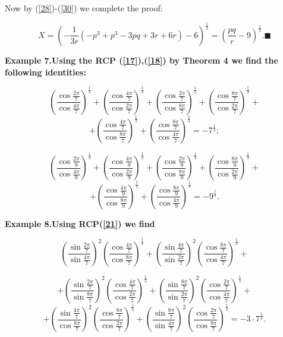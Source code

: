\documentclass[12pt,oneside,english]{amsart}
\begin{document}
Now by (\ref{28})-(\ref{30}) we complete the proof:

$$
X=\left(-\frac{1}{3r}(-p^3+p^3-3pq+3r+6r)-6\right)^{\frac 1
3}=\left(\frac{pq}{r}-9\right)^{\frac 1 3}. \blacksquare
$$

\bfseries Example 7.\mdseries  Using the RCP (\ref{17}),(\ref{18})
by Theorem 4 we find the following identities:

$$
\left(\frac{\cos\frac{2\pi}{7}}{\cos\frac{4\pi}{7}}\right)^{\frac 1
3}+\left(\frac{\cos\frac{4\pi}{7}}{\cos\frac{2\pi}{7}}\right)^{\frac
1
3}+\left(\frac{\cos\frac{2\pi}{7}}{\cos\frac{8\pi}{7}}\right)^{\frac
1
3}+\left(\frac{\cos\frac{8\pi}{7}}{\cos\frac{2\pi}{7}}\right)^{\frac
1 3}+
$$
\begin{equation}\label{31}
+\left(\frac{\cos\frac{4\pi}{7}}{\cos\frac{8\pi}{7}}\right)^{\frac 1
3}+\left(\frac{\cos\frac{8\pi}{7}}{\cos\frac{4\pi}{7}}\right)^{\frac
1 3}=-7^{\frac 1 3};
\end{equation}

$$
\left(\frac{\cos\frac{2\pi}{9}}{\cos\frac{4\pi}{9}}\right)^{\frac 1
3}+\left(\frac{\cos\frac{4\pi}{9}}{\cos\frac{2\pi}{9}}\right)^{\frac
1
3}+\left(\frac{\cos\frac{2\pi}{9}}{\cos\frac{8\pi}{9}}\right)^{\frac
1
3}+\left(\frac{\cos\frac{8\pi}{9}}{\cos\frac{2\pi}{9}}\right)^{\frac
1 3}+
$$
\begin{equation}\label{32}
+\left(\frac{\cos\frac{4\pi}{9}}{\cos\frac{8\pi}{9}}\right)^{\frac 1
3}+\left(\frac{\cos\frac{8\pi}{9}}{\cos\frac{4\pi}{9}}\right)^{\frac
1 3}=-9^{\frac 1 3}.
\end{equation}

\bfseries Example 8.\mdseries  Using RCP(\ref{21}) we find

$$
\left(\frac{\sin\frac{2\pi}{7}}{\sin\frac{4\pi}{7}}\right)^2
\left(\frac{\cos\frac{4\pi}{7}}{\cos\frac{8\pi}{7}}\right)^{\frac 1
3}+\left(\frac{\sin\frac{4\pi}{7}}{\sin\frac{2\pi}{7}}\right)^2
\left(\frac{\cos\frac{8\pi}{7}}{\cos\frac{4\pi}{7}}\right)^{\frac 1
3}+
$$
\newpage

$$
+\left(\frac{\sin\frac{2\pi}{7}}{\sin\frac{8\pi}{7}}\right)^2
\left(\frac{\cos\frac{4\pi}{7}}{\cos\frac{2\pi}{7}}\right)^{\frac 1
3}+\left(\frac{\sin\frac{8\pi}{7}}{\sin\frac{2\pi}{7}}\right)^2
\left(\frac{\cos\frac{2\pi}{7}}{\cos\frac{4\pi}{7}}\right)^{\frac 1
3}+
$$
\begin{equation}\label{33}
+\left(\frac{\sin\frac{4\pi}{7}}{\cos\frac{8\pi}{7}}\right)^2
\left(\frac{\cos\frac{8\pi}{7}}{\cos\frac{2\pi}{7}}\right)^{\frac 1
3}+\left(\frac{\sin\frac{8\pi}{7}}{\sin\frac{4\pi}{7}}\right)^2
\left(\frac{\cos\frac{2\pi}{7}}{\cos\frac{8\pi}{7}}\right)^{\frac 1
3}=-3\cdot 7^{\frac 1 3}.
\end{equation}
\end{document}
